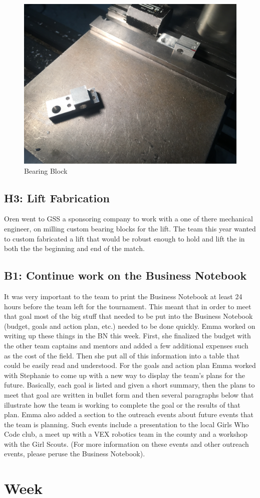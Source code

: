 \documentclass{article}
\begin{document}
\begin{figure}
    \centering
    \includegraphics[width=.6 \textwidth]{09_10-29/images/bearingblock.JPG}
    \caption{Bearing Block}
    \label{fig:bearingblock}
\end{figure}


\subsection{H3: Lift Fabrication}

Oren went to GSS a sponsoring company to work with a one of there mechanical engineer, on milling custom bearing blocks for the lift. The team this year wanted to custom fabricated a lift that would be robust enough to hold and lift the in both the the beginning and end of the match. 
\subsection{B1: Continue work on the Business Notebook}

It was very important to the team to print the Business Notebook at least 24 hours before the team left for the tournament. This meant that in order to meet that goal most of the big stuff that needed to be put into the Business Notebook (budget, goals and action plan, etc.) needed to be done quickly. Emma worked on writing up these things in the BN this week. First, she finalized the budget with the other team captains and mentors and added a few additional expenses such as the cost of the field. Then she put all of this information into a table that could be easily read and understood. For the goals and action plan Emma worked with Stephanie to come up with a new way to display the team's plans for the future. Basically, each goal is listed and given a short summary, then the plans to meet that goal are written in bullet form and then several paragraphs below that illustrate how the team is working to complete the goal or the results of that plan. Emma also added a section to the outreach events about future events that the team is planning. Such events include a presentation to the local Girls Who Code club, a meet up with a VEX robotics team in the county and a workshop with the Girl Scouts. (For more information on these events and other outreach events, please peruse the Business Notebook). 
\clearpage \newpage \section{Week \thesection} 
\end{document}
